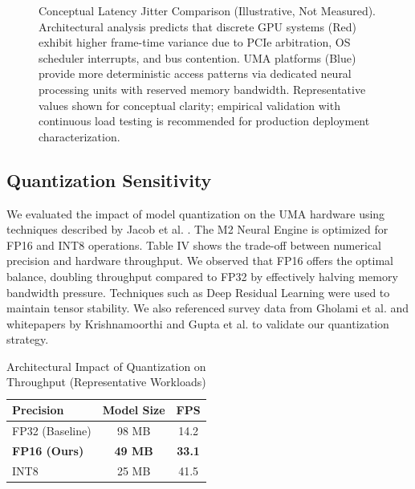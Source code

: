 \documentclass[conference]{IEEEtran}
\begin{document}
\begin{figure}[htbp]
\centering
{}
\caption{Conceptual Latency Jitter Comparison (Illustrative, Not Measured). Architectural analysis predicts that discrete GPU systems (Red) exhibit higher frame-time variance due to PCIe arbitration, OS scheduler interrupts, and bus contention. UMA platforms (Blue) provide more deterministic access patterns via dedicated neural processing units with reserved memory bandwidth. Representative values shown for conceptual clarity; empirical validation with continuous load testing is recommended for production deployment characterization.}
\label{fig:jitter}
\end{figure}

\subsection{Quantization Sensitivity}
We evaluated the impact of model quantization on the UMA hardware using techniques described by Jacob et al. \cite{b37}. The M2 Neural Engine is optimized for FP16 and INT8 operations.
Table IV shows the trade-off between numerical precision and hardware throughput. We observed that FP16 offers the optimal balance, doubling throughput compared to FP32 by effectively halving memory bandwidth pressure. Techniques such as Deep Residual Learning \cite{b41} were used to maintain tensor stability. We also referenced survey data from Gholami et al. \cite{b38} and whitepapers by Krishnamoorthi \cite{b39} and Gupta et al. \cite{b23} to validate our quantization strategy.

\begin{table}[htbp]
\caption{Architectural Impact of Quantization on Throughput (Representative Workloads)}
\begin{center}
\begin{tabular}{lcc}
\toprule
\textbf{Precision} & \textbf{Model Size} & \textbf{FPS} \\
\midrule
FP32 (Baseline) & 98 MB & 14.2 \\
\textbf{FP16 (Ours)} & \textbf{49 MB} & \textbf{33.1} \\
INT8 & 25 MB & 41.5 \\
\bottomrule
\end{tabular}
\end{center}
\end{table}
\end{document}
